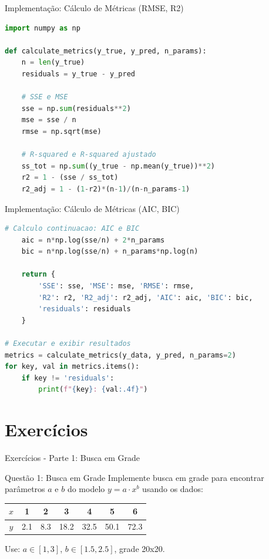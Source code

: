 \begin{frame}[fragile]{Implementação: Cálculo de Métricas (RMSE, R2)}
\begin{lstlisting}[language=Python, caption=Calculo de RMSE e R-squared ajustado, basicstyle=\ttfamily\scriptsize]
import numpy as np

def calculate_metrics(y_true, y_pred, n_params):
    n = len(y_true)
    residuals = y_true - y_pred

    # SSE e MSE
    sse = np.sum(residuals**2)
    mse = sse / n
    rmse = np.sqrt(mse)

    # R-squared e R-squared ajustado
    ss_tot = np.sum((y_true - np.mean(y_true))**2)
    r2 = 1 - (sse / ss_tot)
    r2_adj = 1 - (1-r2)*(n-1)/(n-n_params-1)
\end{lstlisting}
\end{frame}

\begin{frame}[fragile]{Implementação: Cálculo de Métricas (AIC, BIC)}
\begin{lstlisting}[language=Python, caption=Calculo de AIC/BIC e execucao, basicstyle=\ttfamily\scriptsize]
    # Calculo continuacao: AIC e BIC
    aic = n*np.log(sse/n) + 2*n_params
    bic = n*np.log(sse/n) + n_params*np.log(n)

    return {
        'SSE': sse, 'MSE': mse, 'RMSE': rmse,
        'R2': r2, 'R2_adj': r2_adj, 'AIC': aic, 'BIC': bic,
        'residuals': residuals
    }

# Executar e exibir resultados
metrics = calculate_metrics(y_data, y_pred, n_params=2)
for key, val in metrics.items():
    if key != 'residuals':
        print(f"{key}: {val:.4f}")
\end{lstlisting}
\end{frame}

\section{Exercícios}

\begin{frame}{Exercícios - Parte 1: Busca em Grade}
\begin{block}{Questão 1: Busca em Grade}
Implemente busca em grade para encontrar parâmetros $a$ e $b$ do modelo $y = a \cdot x^b$ usando os dados:
\begin{center}
\begin{tabular}{c|cccccc}
$x$ & 1 & 2 & 3 & 4 & 5 & 6 \\
\hline
$y$ & 2.1 & 8.3 & 18.2 & 32.5 & 50.1 & 72.3
\end{tabular}
\end{center}
Use: $a \in [1, 3]$, $b \in [1.5, 2.5]$, grade 20x20.
\end{block}
\end{frame}

